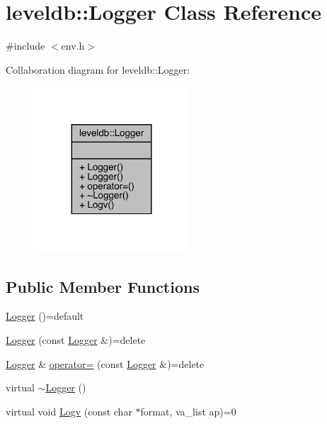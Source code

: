 \hypertarget{classleveldb_1_1_logger}{}\section{leveldb\+::Logger Class Reference}
\label{classleveldb_1_1_logger}


{\ttfamily \#include $<$env.\+h$>$}



Collaboration diagram for leveldb\+::Logger\+:
\nopagebreak
\begin{figure}[H]
\begin{center}
\leavevmode
\includegraphics[width=164pt]{classleveldb_1_1_logger__coll__graph}
\end{center}
\end{figure}
\subsection*{Public Member Functions}
\begin{DoxyCompactItemize}
\item 
\mbox{\hyperlink{classleveldb_1_1_logger_a62fa294a19e7922352fc7eef4f4a79b3}{Logger}} ()=default
\item 
\mbox{\hyperlink{classleveldb_1_1_logger_aff8fcf3685b551086cd7454881e85082}{Logger}} (const \mbox{\hyperlink{classleveldb_1_1_logger}{Logger}} \&)=delete
\item 
\mbox{\hyperlink{classleveldb_1_1_logger}{Logger}} \& \mbox{\hyperlink{classleveldb_1_1_logger_a0e59b980568313abcfc120a9d7022e7e}{operator=}} (const \mbox{\hyperlink{classleveldb_1_1_logger}{Logger}} \&)=delete
\item 
virtual \mbox{\hyperlink{classleveldb_1_1_logger_a9463678882ad3040adf737a9f3a389d7}{$\sim$\+Logger}} ()
\item 
virtual void \mbox{\hyperlink{classleveldb_1_1_logger_a408e238a0028a45e9cc7aec6ad2277c5}{Logv}} (const char $\ast$format, va\+\_\+list ap)=0
\end{DoxyCompactItemize}


